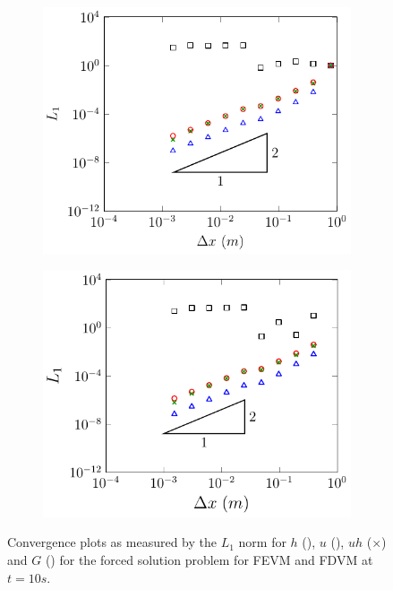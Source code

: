 \begin{figure}
	\centering
	\begin{subfigure}{0.5\textwidth}
		\includegraphics[width=\textwidth]{./chp5/figures/Forced/Dry/P2P/FEVML1.pdf}
		\vspace{0.5cm}
	\end{subfigure}%
	\begin{subfigure}{0.5\textwidth}
		\includegraphics[width=\textwidth]{./chp5/figures/Forced/Dry/P2P/FDVML1.pdf}
		\vspace{0.5cm}
	\end{subfigure}
	\caption{Convergence plots as measured by the $L_1$ norm for $h$ (), $u$ (),  $uh$ ({\color{green!60!black}$\times$})  and $G$ () for the forced solution problem for FEVM and FDVM at $t=10s$.}
\end{figure}

